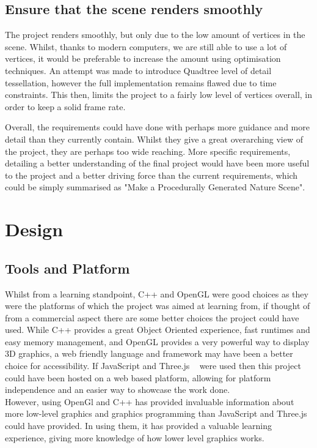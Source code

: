\documentclass[a4paper,10pt]{report}
\begin{document}
\subsection{Ensure that the scene renders smoothly}
The project renders smoothly, but only due to the low amount of vertices in the scene. Whilst, thanks to modern computers, we are still able to use a lot of vertices, it would be preferable to increase the amount using optimisation techniques. An attempt was made to introduce Quadtree level of detail tessellation, however the full implementation remains flawed due to time constraints. This then, limits the project to a fairly low level of vertices overall, in order to keep a solid frame rate.  

Overall, the requirements could have done with perhaps more guidance and more detail than they currently contain. Whilst they give a great overarching view of the project, they are perhaps too wide reaching. More specific requirements, detailing a better understanding of the final project would have been more useful to the project and a better driving force than the current requirements, which could be simply summarised as "Make a Procedurally Generated Nature Scene".

\section{Design}

\subsection{Tools and Platform}
Whilst from a learning standpoint, C++ and OpenGL were good choices as they were the platforms of which the project was aimed at learning from, if thought of from a commercial aspect there are some better choices the project could have used. While C++ provides a great Object Oriented experience, fast runtimes and easy memory management, and OpenGL provides a very powerful way to display 3D graphics, a web friendly language and framework may have been a better choice for accessibility. If JavaScript and Three.js ~\cite{cabello2010three} were used then this project could have been hosted on a web based platform, allowing for platform independence and an easier way to showcase the work done. \\

However, using OpenGl and C++ has provided invaluable information about more low-level graphics and graphics programming than JavaScript and Three.js could have provided. In using them, it has provided a valuable learning experience, giving more knowledge of how lower level graphics works. 
\end{document}
